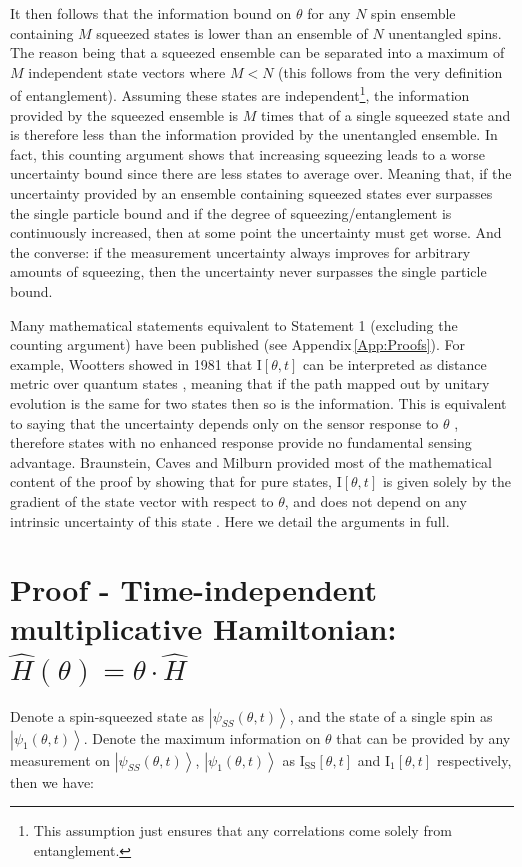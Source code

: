 \documentclass[reqno]{amsart}
\newcommand{\ket}[1]{\left| #1 \right>}
\def\func#1#2{\mathrm{#1}\left[#2\right]}
\def\funcwrt#1#2#3{\mathrm{#1}_{\mathrm{#3}}\left[#2\right]}
\begin{document}
It then follows that the information bound on $\theta$ for any $N$ spin ensemble containing $M$ squeezed states is lower than an ensemble of $N$ unentangled spins. The reason being that a squeezed ensemble can be separated into a maximum of $M$ independent state vectors where $M < N$ (this follows from the very definition of entanglement). Assuming these states are independent\footnote{This assumption just ensures that any correlations come solely from entanglement.}, the information provided by the squeezed ensemble is $M$ times that of a single squeezed state and is therefore less than the information provided by the unentangled ensemble. In fact, this counting argument shows that increasing squeezing leads to a worse uncertainty bound since there are less states to average over. Meaning that, if the uncertainty provided by an ensemble containing squeezed states ever surpasses the single particle bound and if the degree of squeezing/entanglement is continuously increased, then at some point the uncertainty must get worse. And the converse: if the measurement uncertainty always improves for arbitrary amounts of squeezing, then the uncertainty never surpasses the single particle bound.

Many mathematical statements equivalent to Statement 1 (excluding the counting argument) have been published (see Appendix\,\ref{App:Proofs}). For example, Wootters showed in 1981 that $\func{I}{\theta,t}$ can be interpreted as distance metric over quantum states \cite{Wootters1981}, meaning that if the path mapped out by unitary evolution is the same for two states then so is the information. This is equivalent to saying that the uncertainty depends only on the sensor response to $\theta$ \cite{Ou1997, Childs2000, Giovannetti2004, Zwierz2012, Pang2014, Yuan2015, Pang2017, Gorecki2020}, therefore states with no enhanced response provide no fundamental sensing advantage. Braunstein, Caves and Milburn provided most of the mathematical content of the proof by showing that for pure states, $\func{I}{\theta,t}$ is given solely by the gradient of the state vector with respect to $\theta$, and does not depend on any intrinsic uncertainty of this state \cite{Braunstein1996}. Here we detail the arguments in full.

\section*{Proof - Time-independent multiplicative Hamiltonian: $\hat{H}(\theta) = \theta \cdot \hat{H}$}
Denote a spin-squeezed state as $\ket{\psi_{SS}(\theta,t)}$, and the state of a single spin as $\ket{\psi_1(\theta,t)}$. Denote the maximum information on $\theta$ that can be provided by any measurement on $\ket{\psi_{SS}(\theta,t)}$, $\ket{\psi_1(\theta,t)}$ as $\funcwrt{I}{\theta, t}{SS}$ and $\funcwrt{I}{\theta, t}{1}$ respectively, then we have:\\
\end{document}
